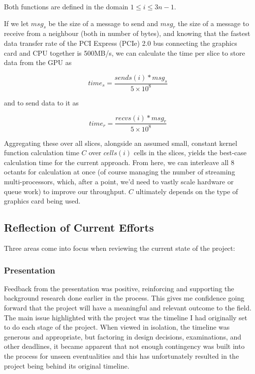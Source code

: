 \documentclass[conference]{IEEEtran}
\begin{document}
Both functions are defined in the domain $ 1 \le i \le 3n - 1 $.

If we let $ msg_s $ be the size of a message to send and $ msg_r $ the size of a message to receive from a neighbour (both in number of bytes), and knowing that the fastest data transfer rate of the PCI Express (PCIe) 2.0 bus connecting the graphics card and CPU together is 500MB/s\cite{PCIe}, we can calculate the time per slice to store data from the GPU as

\begin{equation}
time_s = \frac{sends(i) * msg_s}{5 \times 10^8}
\end{equation}

and to send data to it as

\begin{equation}
time_r = \frac{recvs(i) * msg_r}{5 \times 10^8}
\end{equation}

Aggregating these over all slices, alongside an assumed small, constant kernel function calculation time $ C $ over $ cells(i) $ cells in the slices, yields the best-case calculation time for the current approach. From here, we can interleave all 8 octants for calculation at once (of course managing the number of streaming multi-processors, which, after a point, we'd need to vastly scale hardware or queue work) to improve our throughput. $C$ ultimately depends on the type of graphics card being used.

\subsection{Reflection of Current Efforts}

Three areas come into focus when reviewing the current state of the project:

\subsubsection{Presentation}

Feedback from the presentation was positive, reinforcing and supporting the background research done earlier in the process. This gives me confidence going forward that the project will have a meaningful and relevant outcome to the field. The main issue highlighted with the project was the timeline I had originally set to do each stage of the project. When viewed in isolation, the timeline was generous and appropriate, but factoring in design decisions, examinations, and other deadlines, it became apparent that not enough contingency was built into the process for unseen eventualities and this has unfortunately resulted in the project being behind its original timeline. 
\end{document}
